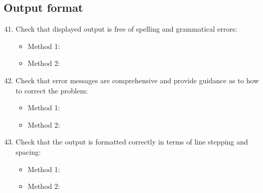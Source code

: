 \subsection{Output format}
\begin{enumerate}
	\setcounter{enumi}{40}
	\item Check that displayed output is free of spelling and grammatical errors:
	\begin{itemize}
		\item Method 1: \cmark
		\item Method 2: \cmark
	\end{itemize}
	\item Check that error messages are comprehensive and provide guidance as to how to correct the problem:
	\begin{itemize}
		\item Method 1: \cmark
		\item Method 2: \cmark
	\end{itemize}
	\item Check that the output is formatted correctly in terms of line stepping and spacing:
	\begin{itemize}
		\item Method 1: \cmark
		\item Method 2: \cmark
	\end{itemize}
\end{enumerate}